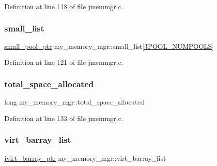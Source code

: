 Definition at line 118 of file jmemmgr.\+c.

\mbox{\label{structmy__memory__mgr_a1c2bfaa346643520a2ff682c38e4ce0d}} 
\subsubsection{\texorpdfstring{small\_list}{small\_list}}
{\footnotesize\ttfamily \mbox{\hyperlink{jmemmgr_8c_a589d78516510f4b5a5d44e28debeab4d}{small\+\_\+pool\+\_\+ptr}} my\+\_\+memory\+\_\+mgr\+::small\+\_\+list\mbox{[}\mbox{\hyperlink{jpeglib_8h_a21147e3031a409bcc8d1ddfa5b2c53b5}{J\+P\+O\+O\+L\+\_\+\+N\+U\+M\+P\+O\+O\+LS}}\mbox{]}}



Definition at line 121 of file jmemmgr.\+c.

\mbox{\label{structmy__memory__mgr_acfcdee3e2d3e3d168e2a2aebe081535f}} 
\subsubsection{\texorpdfstring{total\_space\_allocated}{total\_space\_allocated}}
{\footnotesize\ttfamily long my\+\_\+memory\+\_\+mgr\+::total\+\_\+space\+\_\+allocated}



Definition at line 133 of file jmemmgr.\+c.

\mbox{\label{structmy__memory__mgr_a09b8c66f15f14f1c3c247d98d6c81bbc}} 
\subsubsection{\texorpdfstring{virt\_barray\_list}{virt\_barray\_list}}
{\footnotesize\ttfamily \mbox{\hyperlink{jpeglib_8h_a994f4cba141d82ded90af38e51223f0b}{jvirt\+\_\+barray\+\_\+ptr}} my\+\_\+memory\+\_\+mgr\+::virt\+\_\+barray\+\_\+list}



